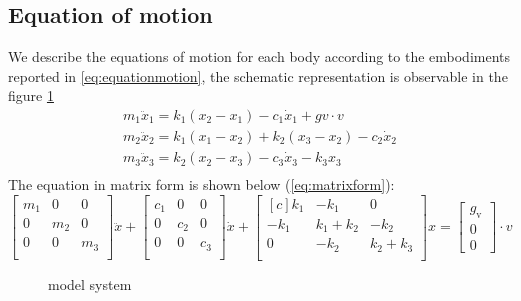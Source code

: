 \subsection{Equation of motion}
\label{subsec:equationofomotion}
We describe the equations of motion for each body according to the embodiments 
reported in \eqref{eq:equationmotion}, the schematic representation is 
observable in the figure \ref{fig:modelscheme}
%
\begin{equation}
	\label{eq:equationmotion}
	\begin{array}{l}
		m_1 \ddot{x}_{1} = k_1 (x_2 - x_1) - c_1 \dot{x}_{1} + gv \cdot v	\\
		m_2 \ddot{x}_{2} = k_1 (x_1 - x_2) + k_2 (x_3 - x_2) - c_2 \dot{x}_{2} \\
		m_3 \ddot{x}_{3} = k_2 (x_2 - x_3) - c_3 \dot{x}_{3} - k_3 x_3	\\
	\end{array}
\end{equation}
%
The equation in matrix form is shown below (\ref{eq:matrixform}):
%
\begin{equation}
	\label{eq:matrixform}
	\begin{bmatrix}
		m_1	&  	0	&	0	\\
 		0	& 	m_2	&	0	\\
 		0	&  	0	&	m_3	\\
	\end{bmatrix} 
	\ddot{x}+
	\begin{bmatrix}
		c_1	&	0	&	0	\\
  		0	&	c_2	&  	0	\\
  		0	&	0	& 	c_3	\\
	\end{bmatrix}
	\dot{x}+
	\begin{bmatrix*}[c]
		k_1		&	-k_1			&       0	\\
 		-k_1		& 	k_1 + k_2	&     -k_2	\\
  		0		&	-k_2			& k_2 + k_3	\\
	 \end{bmatrix*}
 	x=\begin{bmatrix}
 	g_{\text{v}}	\\
 	0 	\\
 	0
 	\end{bmatrix} \cdot v
\end{equation}
%
\begin{figure}[hb]
	\centering
    \resizebox{.8\linewidth}{!}{}
	\caption{model system}
	\label{fig:modelscheme}
\end{figure}
